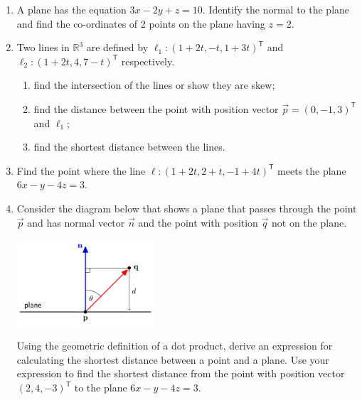\documentclass[a4paper,11pt]{article}
\begin{document}
\begin{enumerate}[label=4.\arabic*]
    \item A plane has the equation $3x - 2y + z = 10$. Identify the normal to the plane and find the co-ordinates of 2 points on the plane having $z = 2$.
    
    \item Two lines in $\mathbb{R}^3$ are defined by $\ell_1: (1 + 2t, -t, 1 + 3t)^\mathsf{T}$ and $\ell_2: (1 + 2t, 4, 7 - t)^\mathsf{T}$ respectively.
    \begin{enumerate}
        \item find the intersection of the lines or show they are skew;
        \item find the distance between the point with position vector $\vec{p} = (0, -1, 3)^\mathsf{T}$ and $\ell_1$;
        \item find the shortest distance between the lines.
    \end{enumerate}

    \item Find the point where the line $\ell:(1 + 2t, 2 + t, -1 + 4t)^\mathsf{T}$ meets the plane $6x - y - 4z = 3$. 
    
    \item Consider the diagram below that shows a plane that passes through the point $\vec{p}$ and has normal vector $\vec{n}$ and the point with position $\vec{q}$ not on the plane. 
    \begin{center}
        \includegraphics[width=0.4\textwidth]{images/4_point_plane_distance.png}
    \end{center}
    Using the geometric definition of a dot product, derive an expression for calculating the shortest distance between a point and a plane. Use your expression to find the shortest distance from the point with position vector $(2, 4, -3)^\mathsf{T}$ to the plane $6x - y - 4z = 3$.
\end{enumerate}
\end{document}
